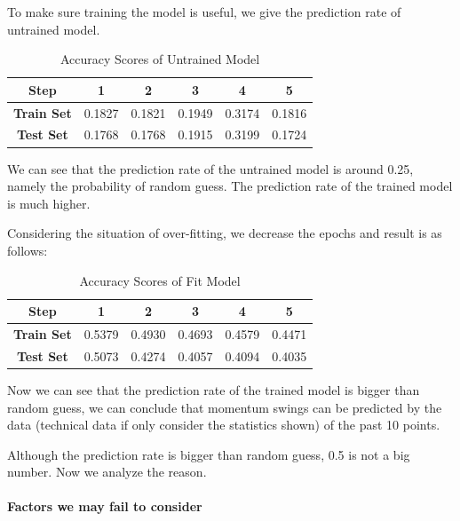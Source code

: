 To make sure training the model is useful, we give the prediction rate of untrained model.

\begin{table}[H]
    \centering
    \begin{tabular}{cccccc}
        \toprule
        \textbf{Step} & \textbf{1} & \textbf{2} & \textbf{3} & \textbf{4} & \textbf{5} \\
        \midrule
        \textbf{Train Set} & 0.1827 & 0.1821 & 0.1949 & 0.3174 & 0.1816 \\
        \textbf{Test Set} & 0.1768 & 0.1768 & 0.1915 & 0.3199 & 0.1724 \\
        \bottomrule
    \end{tabular}
    \caption{Accuracy Scores of Untrained Model}
    \label{tab:predict_rate_untrained}
\end{table}


We can see that the prediction rate of the untrained model is around 0.25,
namely the probability of random guess. 
The prediction rate of the trained model is much higher.

Considering the situation of over-fitting, we decrease the epochs and result is as follows:

\begin{table}[H]
    \centering
    \begin{tabular}{cccccc}
        \toprule
        \textbf{Step} & \textbf{1} & \textbf{2} & \textbf{3} & \textbf{4} & \textbf{5} \\
        \midrule
        \textbf{Train Set} & 0.5379 & 0.4930 & 0.4693 & 0.4579 & 0.4471 \\
        \textbf{Test Set} & 0.5073 & 0.4274 & 0.4057 & 0.4094 & 0.4035 \\
        \bottomrule
    \end{tabular}
    \caption{Accuracy Scores of Fit Model}
    \label{tab:predict_rate_fit}
\end{table}

Now we can see that the prediction rate of the trained model is bigger than random guess,
we can conclude that momentum swings can be predicted by the data 
(technical data if only consider the statistics shown) of the past 10 points.

Although the prediction rate is bigger than random guess, 0.5 is not a big number.
Now we analyze the reason.

\paragraph{Factors we may fail to consider}~{}

